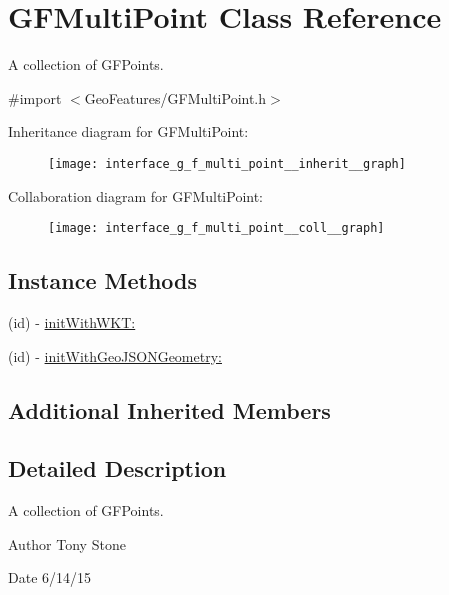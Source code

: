 \hypertarget{interface_g_f_multi_point}{}\section{G\+F\+Multi\+Point Class Reference}
\label{interface_g_f_multi_point}


A collection of G\+F\+Points.  




{\ttfamily \#import $<$Geo\+Features/\+G\+F\+Multi\+Point.\+h$>$}



Inheritance diagram for G\+F\+Multi\+Point\+:\nopagebreak
\begin{figure}[H]
\begin{center}
\leavevmode
\texttt{[image: interface\_g\_f\_multi\_point\_\_inherit\_\_graph]}
\end{center}
\end{figure}


Collaboration diagram for G\+F\+Multi\+Point\+:\nopagebreak
\begin{figure}[H]
\begin{center}
\leavevmode
\texttt{[image: interface\_g\_f\_multi\_point\_\_coll\_\_graph]}
\end{center}
\end{figure}
\subsection*{Instance Methods}
\begin{DoxyCompactItemize}
\item 
(id) -\/ \hyperlink{interface_g_f_multi_point_a76820b1b64308396ee379a5224e6447e}{init\+With\+W\+K\+T\+:}
\item 
(id) -\/ \hyperlink{interface_g_f_multi_point_a6ac08a062d835b8fcf0e1d40e4b73305}{init\+With\+Geo\+J\+S\+O\+N\+Geometry\+:}
\end{DoxyCompactItemize}
\subsection*{Additional Inherited Members}


\subsection{Detailed Description}
A collection of G\+F\+Points. 

\begin{DoxyAuthor}{Author}
Tony Stone 
\end{DoxyAuthor}
\begin{DoxyDate}{Date}
6/14/15 
\end{DoxyDate}


